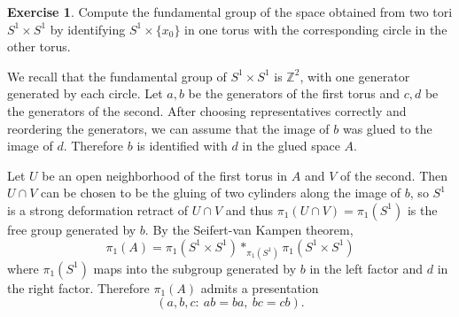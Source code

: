 \documentclass[10pt]{article}
\newcommand{\ZZ}{\mathbb{Z}}
\theoremstyle{definition}
\newtheorem{exer}{Exercise}
\begin{document}
\begin{exer}
Compute the fundamental group of the space obtained from two tori $S^1 \times S^1$ by identifying $S^1 \times \{x_0\}$ in one torus with the corresponding circle in the other torus.
\end{exer}

We recall that the fundamental group of $S^1 \times S^1$ is $\ZZ^2$, with one generator generated by each circle.
Let $a,b$ be the generators of the first torus and $c,d$ be the generators of the second.
After choosing representatives correctly and reordering the generators, we can assume that the image of $b$ was glued to the image of $d$. Therefore $b$ is identified with $d$ in the glued space $A$.

Let $U$ be an open neighborhood of the first torus in $A$ and $V$ of the second. Then $U \cap V$ can be chosen to be the gluing of two cylinders along the image of $b$, so $S^1$ is a strong deformation retract of $U \cap V$ and thus $\pi_1(U \cap V) = \pi_1(S^1)$ is the free group generated by $b$.
By the Seifert-van Kampen theorem,
$$\pi_1(A) = \pi_1(S^1 \times S^1) *_{\pi_1(S^1)} \pi_1(S^1 \times S^1)$$
where $\pi_1(S^1)$ maps into the subgroup generated by $b$ in the left factor and $d$ in the right factor.
Therefore $\pi_1(A)$ admits a presentation
$$(a, b, c:~ ab = ba,~ bc=cb).$$
\end{document}
